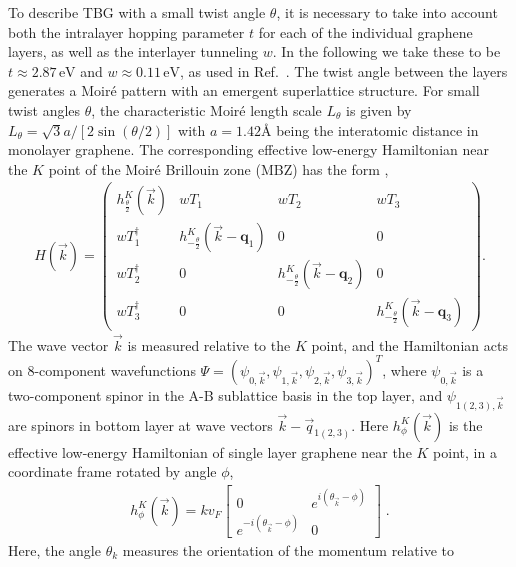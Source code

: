 To describe TBG with a small twist angle  $\theta$, it is necessary to take into account both the intralayer hopping parameter $t$ for each of the individual graphene layers, as well as the interlayer tunneling $w$. In the following we take these to be $t\approx 2.87 \,\text{eV}$ and $w\approx 0.11 \,\text{eV}$, as used in Ref.~\cite{Bistritzer2011}. The twist angle between the layers generates a Moir\'{e} pattern with an emergent superlattice structure. For small twist angles $\theta$, the characteristic Moir\'{e} length scale $L_{\theta}$ is given by $L_{\theta}=\sqrt{3} a /[2 \sin (\theta / 2)]$ with $a=1.42\text{\AA}$ being the interatomic distance in monolayer graphene. The corresponding effective low-energy Hamiltonian near the $K$ point of the Moir\'{e} Brillouin zone (MBZ) has the form \cite{Bistritzer2011,Bernevig2019PRL-TBG},
\begin{align}
	\label{eq:H-TBG-full}
	H(\vec{k}) = \left(\begin{array}{cccc}
		h_{\frac{\theta}{2}}^{K}(\vec{k}) & w T_1 & w T_2 & w T_3 \\
		w T_1^{\dagger} & h_{-\frac{\theta}{2}}^{K}(\vec{k}-\mathbf{q}_1) & 0 & 0 \\
		w T_2^{\dagger} & 0 & h_{-\frac{\theta}{2}}^{K}(\vec{k}-\mathbf{q}_2) & 0 \\
		w T_3^{\dagger} & 0 & 0 & h_{-\frac{\theta}{2}}^{K}(\vec{k}-\mathbf{q}_3)
	\end{array}\right).
\end{align}
The wave vector $\vec{k}$ is measured relative to the $K$ point, and the Hamiltonian acts on 8-component wavefunctions $\Psi=\left(\psi_{0, \vec{k}}, \psi_{1, \vec{k}}, \psi_{2, \vec{k}}, \psi_{3, \vec{k}}\right)^T$, where $\psi_{0, \vec{k}}$ is a two-component spinor in the A-B sublattice basis in the top layer, and $\psi_{1(2,3), \vec{k}}$ are spinors in bottom layer at wave vectors $\vec{k}-\vec{q}_{1(2,3)}$.
Here $h_{\phi}^{K}(\vec{k})$ is the effective low-energy Hamiltonian of single layer graphene near the $K$ point, in a coordinate frame rotated by angle $\phi$,
\begin{align}
	h_{\phi}^K(\vec{k})=k v_F \left[\begin{array}{cc}
		0 & e^{i\left(\theta_{\vec{k}}-\phi\right)} \\
		e^{-i\left(\theta_{\vec{k}}-\phi\right)} & 0
	\end{array}\right]\;.
	\label{eq:hKtheta}
\end{align}
Here, the angle $\theta_k$ measures the orientation of the momentum relative to
